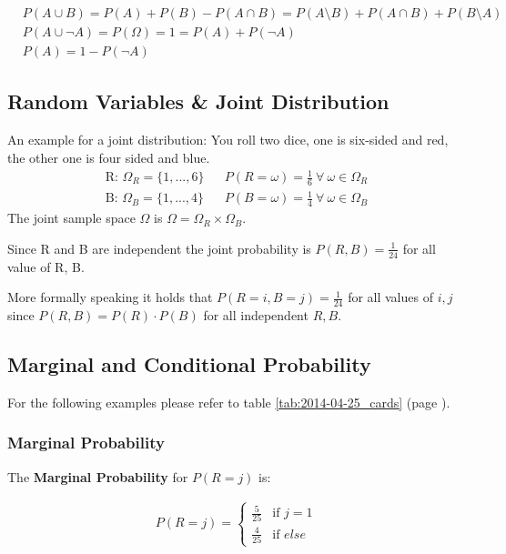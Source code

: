 \begin{align*}
& P(A \cup B) = P(A) + P(B) - P(A \cap B) = P(A \setminus B) + P(A \cap B) + P(B \setminus A)\\
& P(A \cup \neg A) = P(\Omega) = 1 = P(A) + P(\neg A)\\
& P(A) = 1- P(\neg A)
\end{align*}



\subsection{Random Variables \& Joint Distribution}
An example for a joint distribution: You roll two dice, one is six-sided and red, the other one is four sided and blue.
\begin{align*}
\mbox{R: }\Omega_R = \{1, ..., 6\} & & P(R=\omega) = \frac{1}{6}\ \forall\ \omega \in \Omega_R\\
\mbox{B: }\Omega_B = \{1, ..., 4\} & & P(B=\omega) = \frac{1}{4}\ \forall\ \omega \in \Omega_B
\end{align*}
The joint sample space $\Omega$ is $\Omega = \Omega_R \times \Omega_B$.

Since R and B are independent the joint probability is $ P(R, B) = \frac{1}{24}$ for all value of R, B.

More formally speaking it holds that $P(R=i, B=j) = \frac{1}{24}$ for all values of $i, j$ since $P(R, B) = P(R) \cdot P(B)$ for all independent $R, B$.



\subsection{Marginal and Conditional Probability}
For the following examples please refer to table \ref{tab:2014-04-25_cards} (page \pageref{tab:2014-04-25_cards}).

\subsubsection*{Marginal Probability}
The \textbf{Marginal Probability} for $P(R=j)$ is:

\begin{align*}
P(R=j) = 
\begin{cases} 
\frac{5}{25} & \mbox{if } j = 1 \\ 
\frac{4}{25} & \mbox{if } else
\end{cases}
\end{align*}

